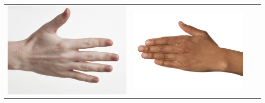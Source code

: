 \begin{longtable}{|N||c|c|c|}
\begin{minipage}{.29\textwidth}
    \includegraphics[width=\textwidth,height=\textheight,keepaspectratio]{../inputs/hand_pale.jpg}
  \end{minipage} & 
  \begin{minipage}{.29\textwidth}
    \includegraphics[width=\textwidth,height=\textheight,keepaspectratio]{../inputs/hand_brown.jpg}
  \end{minipage} & 
  \begin{minipage}{.29\textwidth}

\end{minipage}
\end{longtable}
